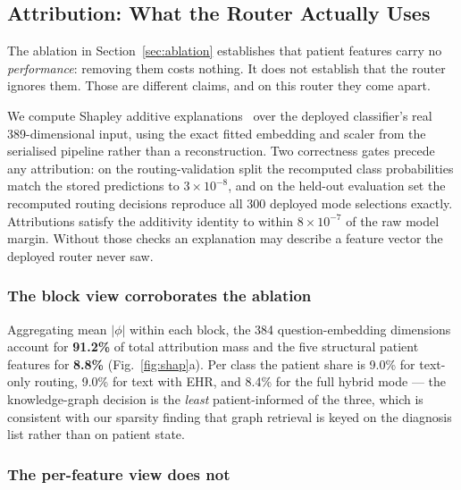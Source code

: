 
\subsection{Attribution: What the Router Actually Uses}
\label{sec:shap}

The ablation in Section~\ref{sec:ablation} establishes that patient features
carry no \emph{performance}: removing them costs nothing. It does not establish
that the router ignores them. Those are different claims, and on this router
they come apart.

We compute Shapley additive explanations~\cite{lundberg2017} over the deployed
classifier's real 389-dimensional input, using the exact fitted embedding and
scaler from the serialised pipeline rather than a reconstruction. Two
correctness gates precede any attribution: on the routing-validation split the
recomputed class probabilities match the stored predictions to $3\times10^{-8}$,
and on the held-out evaluation set the recomputed routing decisions reproduce
all 300 deployed mode selections exactly. Attributions satisfy the additivity
identity to within $8\times10^{-7}$ of the raw model margin. Without those
checks an explanation may describe a feature vector the deployed router never
saw.

\subsubsection*{The block view corroborates the ablation}

Aggregating mean $|\phi|$ within each block, the 384 question-embedding
dimensions account for \textbf{91.2\%} of total attribution mass and the five
structural patient features for \textbf{8.8\%} (Fig.~\ref{fig:shap}a). Per
class the patient share is 9.0\% for text-only routing, 9.0\% for text with
EHR, and 8.4\% for the full hybrid mode --- the knowledge-graph decision is the
\emph{least} patient-informed of the three, which is consistent with our
sparsity finding that graph retrieval is keyed on the diagnosis list rather
than on patient state.

\subsubsection*{The per-feature view does not}

